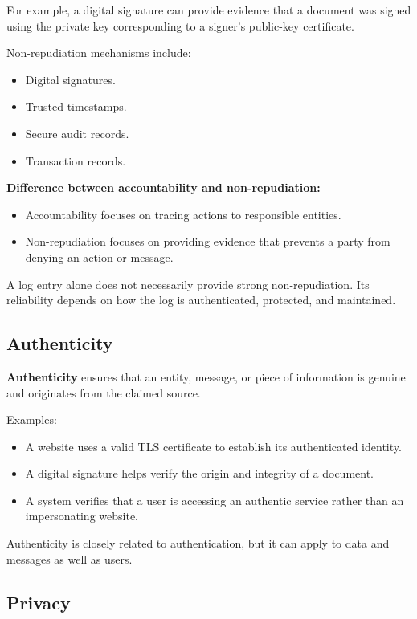 For example, a digital signature can provide evidence that a document was signed using the private key corresponding to a signer's public-key certificate.

Non-repudiation mechanisms include:

\begin{itemize}
\item Digital signatures.
\item Trusted timestamps.
\item Secure audit records.
\item Transaction records.
\end{itemize}

\textbf{Difference between accountability and non-repudiation:}

\begin{itemize}
\item Accountability focuses on tracing actions to responsible entities.
\item Non-repudiation focuses on providing evidence that prevents a party from denying an action or message.
\end{itemize}

A log entry alone does not necessarily provide strong non-repudiation. Its reliability depends on how the log is authenticated, protected, and maintained.

\subsection{Authenticity}

\textbf{Authenticity} ensures that an entity, message, or piece of information is genuine and originates from the claimed source.

Examples:

\begin{itemize}
\item A website uses a valid TLS certificate to establish its authenticated identity.
\item A digital signature helps verify the origin and integrity of a document.
\item A system verifies that a user is accessing an authentic service rather than an impersonating website.
\end{itemize}

Authenticity is closely related to authentication, but it can apply to data and messages as well as users.

\subsection{Privacy}


